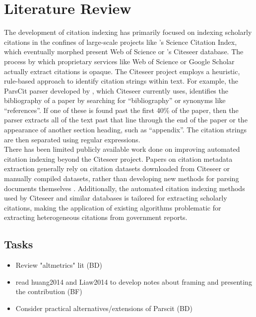 \documentclass[12pt]{article}
\begin{document}
\section{Literature Review}
The development of citation indexing has primarily focused on indexing scholarly citations in the confines of large-scale projects like 's Science Citation Index, which eventually morphed present Web of Science or 's Citeseer database. The process by which proprietary services like Web of Science or Google Scholar actually extract citations is opaque. The Citeseer project employs a heuristic, rule-based approach to identify citation strings within text. For example, the ParsCit parser developed by , which Citeseer currently uses, identifies the bibliography of a paper by searching for ``bibliography'' or synonyms like ``references''. If one of these is found past the first 40\% of the paper, then the parser extracts all of the text past that line through the end of the paper or the appearance of another section heading, such as ``appendix''. The citation strings are then separated using regular expressions. \\

There has been limited publicly available work done on improving automated citation indexing beyond the Citeseer project. Papers on citation metadata extraction generally rely on citation datasets downloaded from Citeseer or manually compiled datasets, rather than developing new methods for parsing documents themselves \cite{anzaroot2013}. Additionally, the automated citation indexing methods used by Citeseer and similar databases is tailored for extracting scholarly citations, making the application of existing algorithms problematic for extracting heterogeneous citations from government reports.\\

\subsection{Tasks}

\begin{itemize}
\item Review "altmetrics" lit (BD)
\item  read huang2014 and Liaw2014 to develop notes about framing and presenting the contribution (BF)
\item Consider practical alternatives/extensions of Parscit (BD)
\end{itemize}
\end{document}
